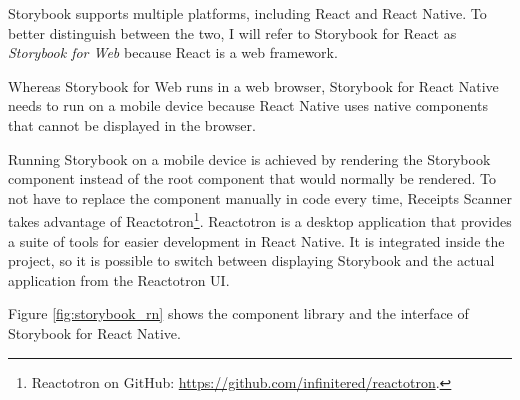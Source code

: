 \documentclass[
  printed, %
  table,   %
  oneside, %
  lof,     %
  lot,     %
]{fithesis3}
\begin{document}
Storybook supports multiple platforms, including React and React Native. To better distinguish between the two, I will refer to Storybook for React as \textit{Storybook for Web} because React is a web framework.

Whereas Storybook for Web runs in a web browser, Storybook for React Native needs to run on a mobile device because React Native uses native components that cannot be displayed in the browser.

\label{phantom:reactotron}
Running Storybook on a mobile device is achieved by rendering the Storybook component instead of the root component that would normally be rendered. To not have to replace the component manually in code every time, Receipts Scanner takes advantage of Reactotron\footnote{Reactotron on GitHub: \url{https://github.com/infinitered/reactotron}.}. Reactotron is a desktop application that provides a suite of tools for easier development in React Native. It is integrated inside the project, so it is possible to switch between displaying Storybook and the actual application from the Reactotron UI. 

Figure \ref{fig:storybook_rn} shows the component library and the interface of Storybook for React Native.
\end{document}
